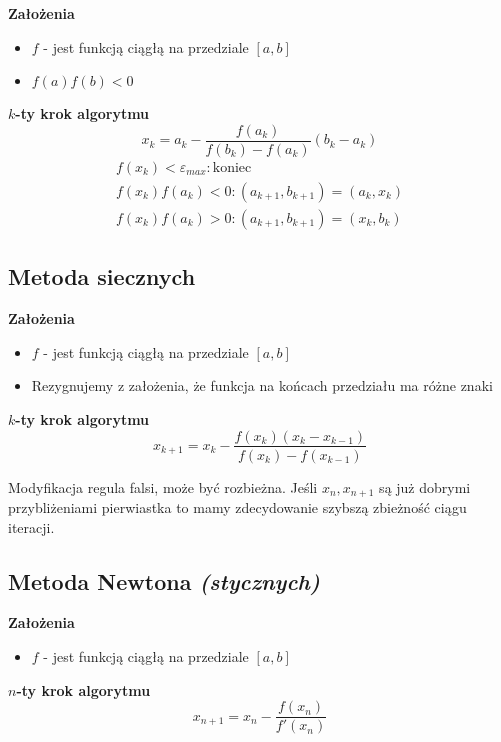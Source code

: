\documentclass[../mn-notatki.tex]{subfiles}
\begin{document}
\begin{tcolorbox}
\textbf{Założenia}
\begin{itemize}
    \item $f$ - jest funkcją ciągłą na przedziale $[a,b]$
    \item $f(a)f(b) < 0$\\
\end{itemize}

\textbf{$k$-ty krok algorytmu}
\[
x_k = a_k - \frac{f(a_k)}{f(b_k) - f(a_k)}(b_k - a_k)
\]
\begin{gather*}
f(x_k) < \varepsilon_{max} : \text{koniec}\\
f(x_k)f(a_k) < 0 : (a_{k+1}, b_{k+1}) = (a_k, x_k)\\
f(x_k)f(a_k) > 0 : (a_{k+1}, b_{k+1}) = (x_k, b_k)
\end{gather*}

\end{tcolorbox}

\subsection{Metoda siecznych}

\begin{tcolorbox}
\textbf{Założenia}
\begin{itemize}
    \item $f$ - jest funkcją ciągłą na przedziale $[a,b]$
    \item Rezygnujemy z założenia, że funkcja na końcach przedziału ma różne znaki\\
\end{itemize}

\textbf{$k$-ty krok algorytmu}
\[
x_{k+1} = x_k - \frac{f(x_k)(x_k - x_{k-1})}{f(x_k) - f(x_{k-1})}
\]
\end{tcolorbox}

Modyfikacja regula falsi, może być rozbieżna. Jeśli $x_n, x_{n+1}$ są już
dobrymi przybliżeniami pierwiastka to mamy zdecydowanie szybszą zbieżność ciągu
iteracji.

\subsection{Metoda Newtona \textit{(stycznych)}}

\begin{tcolorbox}
\textbf{Założenia}
\begin{itemize}
    \item $f$ - jest funkcją ciągłą na przedziale $[a,b]$
\end{itemize}

\textbf{$n$-ty krok algorytmu}
\[
x_{n+1} = x_n - \frac{f(x_n)}{f'(x_n)}
\]
\end{tcolorbox}
\end{document}
